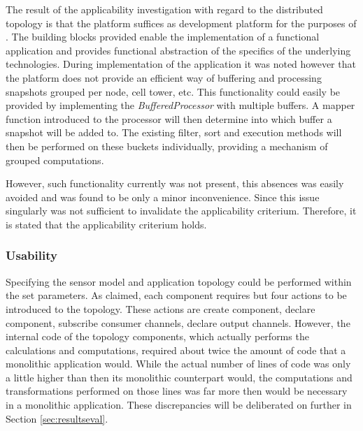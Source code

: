 The result of the applicability investigation with regard to the distributed topology is that the platform suffices as development platform for the purposes of \idsystemsnospace. The building blocks provided enable the implementation of a functional application and provides functional abstraction of the specifics of the underlying technologies. During implementation of the application it was noted however that the platform does not provide an efficient way of buffering and processing snapshots grouped per node, cell tower, etc. This functionality could easily be provided by implementing the \emph{BufferedProcessor} with multiple buffers. A mapper function introduced to the processor will then determine into which buffer a snapshot will be added to. The existing filter, sort and execution methods will then be performed on these buckets individually, providing a mechanism of grouped computations.

However, such functionality currently was not present, this absences was easily avoided and was found to be only a minor inconvenience. Since this issue singularly was not sufficient to invalidate the applicability criterium. Therefore, it is stated that the applicability criterium holds.

\subsubsection{Usability}
Specifying the sensor model and application topology could be performed within the set parameters. As claimed, each component requires but four actions to be introduced to the topology. These actions are create component, declare component, subscribe consumer channels, declare output channels. However, the internal code of the topology components, which actually performs the calculations and computations, required about twice the amount of code that a monolithic application would. While the actual number of lines of code was only a little higher than then its monolithic counterpart would, the computations and transformations performed on those lines was far more then would be necessary in a monolithic application. These discrepancies will be deliberated on further in Section \ref{sec:resultseval}.

